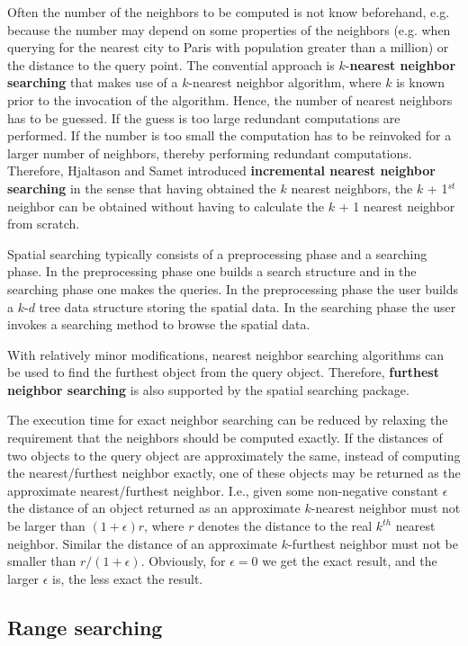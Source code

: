 Often the number of the neighbors to be computed is not know
beforehand, e.g. because the number may depend on some properties of
the neighbors (e.g. when querying for the nearest city to Paris with
population greater than a million) or the distance to the query point.
The convential approach is $k$-{\bf nearest neighbor searching} that
makes use of a $k$-nearest neighbor algorithm, where $k$ is known
prior to the invocation of the algorithm.  Hence, the number of
nearest neighbors has to be guessed. If the guess is too large
redundant computations are performed.  If the number is too small the
computation has to be reinvoked for a larger number of neighbors,
thereby performing redundant computations.  Therefore, Hjaltason and
Samet \cite{hs-rsd-95} introduced {\bf incremental nearest neighbor
searching} in the sense that having obtained the $k$ nearest
neighbors, the $k$ + 1$^{st}$ neighbor can be obtained without having
to calculate the $k$ + 1 nearest neighbor from scratch.
 

Spatial searching typically consists of a preprocessing phase and a
searching phase.  In the preprocessing phase one builds a search
structure and in the searching phase one makes the queries.  In the
preprocessing phase the user builds a $k$-$d$ tree data structure
storing the spatial data.  In the searching phase the user invokes a
searching method to browse the spatial data.

With relatively minor modifications, nearest neighbor searching
algorithms can be used to find the furthest object from the query
object.  Therefore, {\bf furthest neighbor searching} is also
supported by the spatial searching package.

The execution time for exact neighbor searching can be reduced by
relaxing the requirement that the neighbors should be computed
exactly.  If the distances of two objects to the query object are
approximately the same, instead of computing the nearest/furthest
neighbor exactly, one of these objects may be returned as the
approximate nearest/furthest neighbor. I.e., given some non-negative
constant $\epsilon$ the distance of an object returned as an
approximate $k$-nearest neighbor must not be larger than
$(1+\epsilon)r$, where $r$ denotes the distance to the real $k^{th}$
nearest neighbor.  Similar the distance of an approximate $k$-furthest
neighbor must not be smaller than $r/(1+\epsilon)$.  Obviously, for
$\epsilon=0$ we get the exact result, and the larger $\epsilon$ is,
the less exact the result.

\subsection{Range searching}

